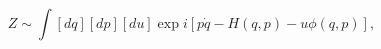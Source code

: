 \begin{equation}
Z\sim \int [dq][dp][du]\exp i\left[ p\dot{q}-H(q,p)-u\phi (q,p)\right] ,
\end{equation}

